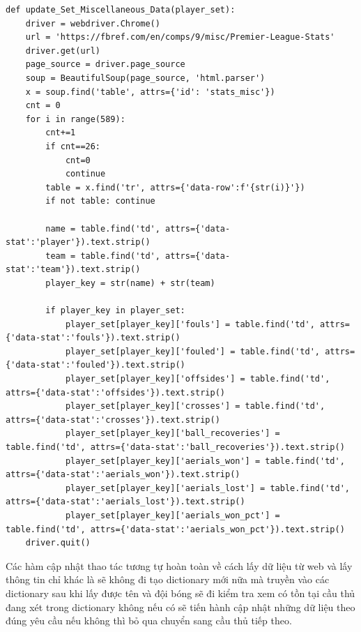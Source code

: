 \documentclass[12pt]{report}
\begin{document}
{\begin{lstlisting}
def update_Set_Miscellaneous_Data(player_set):
    driver = webdriver.Chrome()
    url = 'https://fbref.com/en/comps/9/misc/Premier-League-Stats'
    driver.get(url)
    page_source = driver.page_source
    soup = BeautifulSoup(page_source, 'html.parser')
    x = soup.find('table', attrs={'id': 'stats_misc'})
    cnt = 0
    for i in range(589):
        cnt+=1
        if cnt==26:
            cnt=0
            continue
        table = x.find('tr', attrs={'data-row':f'{str(i)}'})
        if not table: continue

        name = table.find('td', attrs={'data-stat':'player'}).text.strip()
        team = table.find('td', attrs={'data-stat':'team'}).text.strip()
        player_key = str(name) + str(team)

        if player_key in player_set:
            player_set[player_key]['fouls'] = table.find('td', attrs={'data-stat':'fouls'}).text.strip()
            player_set[player_key]['fouled'] = table.find('td', attrs={'data-stat':'fouled'}).text.strip()
            player_set[player_key]['offsides'] = table.find('td', attrs={'data-stat':'offsides'}).text.strip()
            player_set[player_key]['crosses'] = table.find('td', attrs={'data-stat':'crosses'}).text.strip()
            player_set[player_key]['ball_recoveries'] = table.find('td', attrs={'data-stat':'ball_recoveries'}).text.strip()
            player_set[player_key]['aerials_won'] = table.find('td', attrs={'data-stat':'aerials_won'}).text.strip()
            player_set[player_key]['aerials_lost'] = table.find('td', attrs={'data-stat':'aerials_lost'}).text.strip()
            player_set[player_key]['aerials_won_pct'] = table.find('td', attrs={'data-stat':'aerials_won_pct'}).text.strip()
    driver.quit()

\end{lstlisting}
Các hàm cập nhật thao tác tương tự hoàn toàn về cách lấy dữ liệu từ web và lấy thông tin chỉ khác là sẽ không đi tạo dictionary mới nữa mà truyền vào các dictionary sau khi lấy được tên và đội bóng sẽ đi kiểm tra xem có tồn tại cầu thủ đang xét trong dictionary không nếu có sẽ tiến hành cập nhật những dữ liệu theo đúng yêu cầu nếu không thì bỏ qua chuyển sang cầu thủ tiếp theo.\\

}
\end{document}
